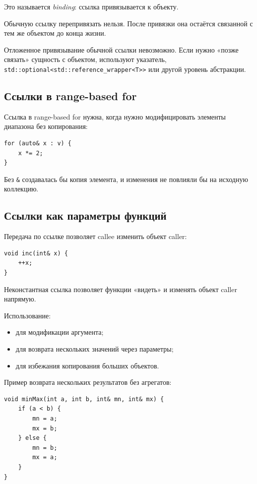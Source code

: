 Это называется \textit{binding}: ссылка привязывается к объекту.

\begin{remark}
Обычную ссылку перепривязать нельзя. После привязки она остаётся связанной с тем же объектом до конца жизни.
\end{remark}

Отложенное привязывание обычной ссылки невозможно.  
Если нужно «позже связать» сущность с объектом, используют указатель, \texttt{std::optional<std::reference\_wrapper<T>>} или другой уровень абстракции.

\subsection{Ссылки в range-based for}
Ссылка в range-based for нужна, когда нужно модифицировать элементы диапазона без копирования:
\begin{verbatim}
for (auto& x : v) {
    x *= 2;
}
\end{verbatim}

\begin{remark}
Без \texttt{\&} создавалась бы копия элемента, и изменения не повлияли бы на исходную коллекцию.
\end{remark}

\subsection{Ссылки как параметры функций}
Передача по ссылке позволяет callee изменить объект caller:
\begin{verbatim}
void inc(int& x) {
    ++x;
}
\end{verbatim}

\begin{definition}
Неконстантная ссылка позволяет функции «видеть» и изменять объект caller напрямую.
\end{definition}

Использование:
\begin{itemize}
    \item для модификации аргумента;
    \item для возврата нескольких значений через параметры;
    \item для избежания копирования больших объектов.
\end{itemize}

Пример возврата нескольких результатов без агрегатов:
\begin{verbatim}
void minMax(int a, int b, int& mn, int& mx) {
    if (a < b) {
        mn = a;
        mx = b;
    } else {
        mn = b;
        mx = a;
    }
}
\end{verbatim}

